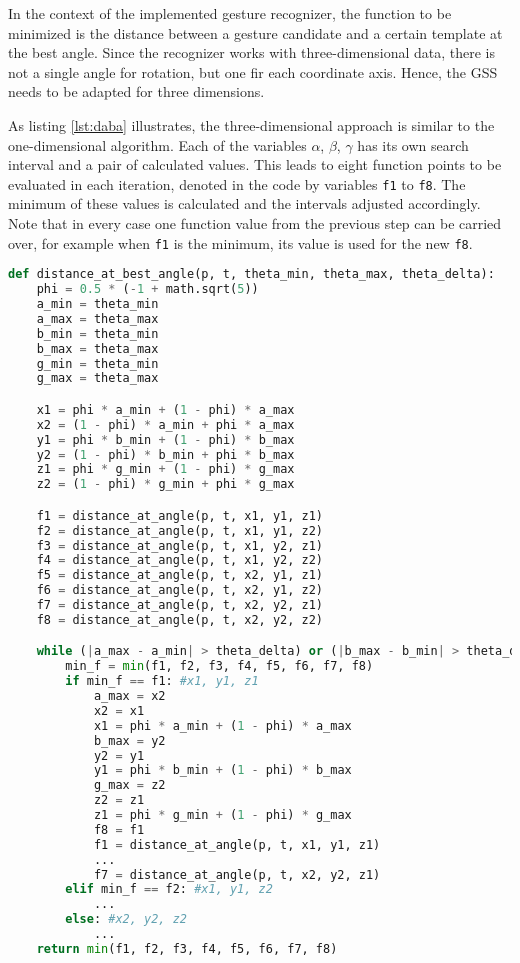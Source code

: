 In the context of the implemented gesture recognizer, the function to be minimized is the distance between a gesture candidate and a certain template at the best angle. Since the recognizer works with three-dimensional data, there is not a single angle for rotation, but one fir each coordinate axis. Hence, the \ac{GSS} needs to be adapted for three dimensions.

As listing \ref{lst:daba} illustrates, the three-dimensional approach is similar to the one-dimensional algorithm. Each of the variables $\alpha$, $ \beta $, $ \gamma $ has its own search interval and a pair of calculated values. This leads to eight function points to be evaluated in each iteration, denoted in the code by variables \texttt{f1} to \texttt{f8}. The minimum of these values is calculated and the intervals adjusted accordingly. Note that in every case one function value from the previous step can be carried over, for example when \texttt{f1} is the minimum, its value is used for the new \texttt{f8}.

\begin{lstlisting}[label=lst:daba,language=python,frame=lt,caption=Three-dimensional Golden Section Search for finding the best angle between a candidate gesture and a template]
def distance_at_best_angle(p, t, theta_min, theta_max, theta_delta):
	phi = 0.5 * (-1 + math.sqrt(5))
	a_min = theta_min
	a_max = theta_max
	b_min = theta_min
	b_max = theta_max
	g_min = theta_min
	g_max = theta_max

	x1 = phi * a_min + (1 - phi) * a_max
	x2 = (1 - phi) * a_min + phi * a_max
	y1 = phi * b_min + (1 - phi) * b_max
	y2 = (1 - phi) * b_min + phi * b_max
	z1 = phi * g_min + (1 - phi) * g_max
	z2 = (1 - phi) * g_min + phi * g_max	

	f1 = distance_at_angle(p, t, x1, y1, z1)
	f2 = distance_at_angle(p, t, x1, y1, z2)
	f3 = distance_at_angle(p, t, x1, y2, z1)
	f4 = distance_at_angle(p, t, x1, y2, z2)
	f5 = distance_at_angle(p, t, x2, y1, z1)
	f6 = distance_at_angle(p, t, x2, y1, z2)
	f7 = distance_at_angle(p, t, x2, y2, z1)
	f8 = distance_at_angle(p, t, x2, y2, z2)

	while (|a_max - a_min| > theta_delta) or (|b_max - b_min| > theta_delta) or (|g_max - g_min| > theta_delta):	
		min_f = min(f1, f2, f3, f4, f5, f6, f7, f8)
		if min_f == f1: #x1, y1, z1
			a_max = x2
			x2 = x1
			x1 = phi * a_min + (1 - phi) * a_max
			b_max = y2
			y2 = y1
			y1 = phi * b_min + (1 - phi) * b_max
			g_max = z2
			z2 = z1
			z1 = phi * g_min + (1 - phi) * g_max
			f8 = f1
			f1 = distance_at_angle(p, t, x1, y1, z1)
			...
			f7 = distance_at_angle(p, t, x2, y2, z1)
		elif min_f == f2: #x1, y1, z2
			...
		else: #x2, y2, z2
			...
	return min(f1, f2, f3, f4, f5, f6, f7, f8)
\end{lstlisting}

